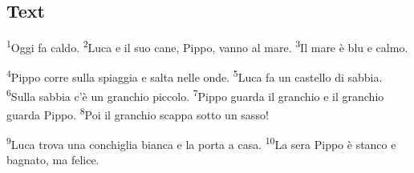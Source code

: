 \documentclass[11pt,a4paper,twoside,openright]{book}
\newenvironment{storytext}{\par\begingroup\large\setlength{\parskip}{8pt}\linespread{1.15}\selectfont}{\par\endgroup}
\newcommand{\sentnum}[1]{\textsuperscript{\color{muted}\tiny #1}}
\begin{document}
\subsection*{Text}
\begin{storytext}
\sentnum{1}Oggi fa caldo. \sentnum{2}Luca e il suo cane, Pippo, vanno al mare. \sentnum{3}Il mare è blu e calmo.\par
\sentnum{4}Pippo corre sulla spiaggia e salta nelle onde. \sentnum{5}Luca fa un castello di sabbia. \sentnum{6}Sulla sabbia c'è un granchio piccolo. \sentnum{7}Pippo guarda il granchio e il granchio guarda Pippo. \sentnum{8}Poi il granchio scappa sotto un sasso!\par
\sentnum{9}Luca trova una conchiglia bianca e la porta a casa. \sentnum{10}La sera Pippo è stanco e bagnato, ma felice.\par
\end{storytext}
\end{document}
